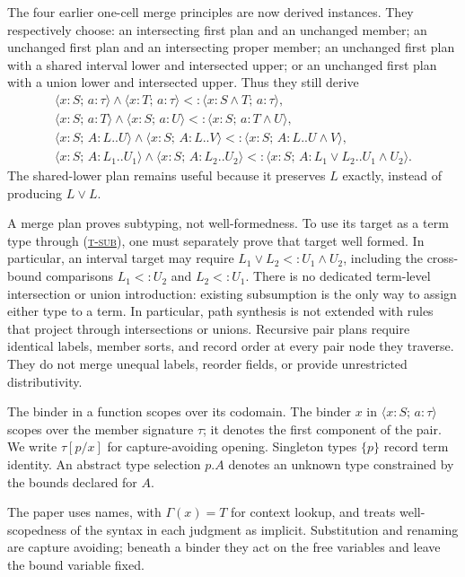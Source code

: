 \documentclass[acmsmall,screen,nonacm]{acmart}
\newcommand{\ruleref}[1]{%
  \textsc{(\hyperref[rule:#1]{#1})}}
\newcommand{\sing}[1]{\{#1\}}
\newcommand{\pairty}[4]{\langle #1\!:\!#2;\,#3\!:\!#4\rangle}
\newcommand{\interty}[2]{#1\mathbin{\wedge}#2}
\newcommand{\unionty}[2]{#1\mathbin{\vee}#2}
\newcommand{\subst}[3]{#1[#2/#3]}
\begin{document}
The four earlier one-cell merge principles are now derived instances. They
respectively choose: an intersecting first plan and an unchanged member; an
unchanged first plan and an intersecting proper member; an unchanged first
plan with a shared interval lower and intersected upper; or an unchanged
first plan with a union lower and intersected upper. Thus they still derive
\[
\begin{gathered}
  \interty{\pairty{x}{S}{a}{\tau}}{\pairty{x}{T}{a}{\tau}}
    <:\pairty{x}{\interty{S}{T}}{a}{\tau},
  \\
  \interty{\pairty{x}{S}{a}{T}}{\pairty{x}{S}{a}{U}}
    <:\pairty{x}{S}{a}{\interty{T}{U}},
  \\
  \interty{\pairty{x}{S}{A}{L..U}}{\pairty{x}{S}{A}{L..V}}
    <:\pairty{x}{S}{A}{L..\interty{U}{V}},
  \\
  \interty{\pairty{x}{S}{A}{L_1..U_1}}
           {\pairty{x}{S}{A}{L_2..U_2}}
    <:\pairty{x}{S}{A}
       {\unionty{L_1}{L_2}..\interty{U_1}{U_2}}.
\end{gathered}
\]
The shared-lower plan remains useful because it preserves \(L\) exactly,
instead of producing \(\unionty{L}{L}\).

A merge plan proves subtyping, not well-formedness. To use its target as a
term type through \ruleref{t-sub}, one must separately prove that target well
formed. In particular, an interval target may require
\(\unionty{L_1}{L_2}<:\interty{U_1}{U_2}\), including the cross-bound
comparisons \(L_1<:U_2\) and \(L_2<:U_1\).
There is no dedicated term-level intersection or union introduction: existing
subsumption is the only way to assign either type to a term. In particular,
path synthesis is not extended with rules that project through intersections
or unions. Recursive pair plans require identical labels, member sorts, and
record order at every pair node they traverse. They do not merge unequal
labels, reorder fields, or provide unrestricted distributivity.

The binder in a function scopes over its codomain. The binder \(x\) in
\(\pairty{x}{S}{a}{\tau}\) scopes over the member signature \(\tau\); it
denotes the first component of the pair. We write
\(\subst{\tau}{p}{x}\) for capture-avoiding opening. Singleton types
\(\sing{p}\) record term identity. An abstract type selection \(p.A\) denotes an
unknown type constrained by the bounds declared for \(A\).

The paper uses names, with \(\Gamma(x)=T\) for context lookup, and treats
well-scopedness of the syntax in each judgment as implicit. Substitution and
renaming are capture avoiding; beneath a binder they act on the free variables
and leave the bound variable fixed.
\end{document}
